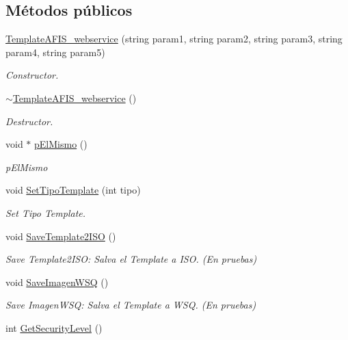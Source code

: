 \subsection*{Métodos públicos}
\begin{DoxyCompactItemize}
\item 
\hyperlink{classTemplateAFIS__webservice_ace8ba45d6e489c7d34bfbfb55970724f}{Template\+A\+F\+I\+S\+\_\+webservice} (string param1, string param2, string param3, string param4, string param5)
\begin{DoxyCompactList}\small\item\em Constructor. \end{DoxyCompactList}\item 
\hyperlink{classTemplateAFIS__webservice_ad58b565c76e20bdd9272401d7319cb25}{$\sim$\+Template\+A\+F\+I\+S\+\_\+webservice} ()
\begin{DoxyCompactList}\small\item\em Destructor. \end{DoxyCompactList}\item 
void $\ast$ \hyperlink{classTemplateAFIS__webservice_a85f73ddfc479ea1f9ba3a6467d1c028b}{p\+El\+Mismo} ()
\begin{DoxyCompactList}\small\item\em p\+El\+Mismo \end{DoxyCompactList}\item 
void \hyperlink{classTemplateAFIS__webservice_a6357de3d3323010cb5890d2f583e0f94}{Set\+Tipo\+Template} (int tipo)
\begin{DoxyCompactList}\small\item\em Set Tipo Template. \end{DoxyCompactList}\item 
void \hyperlink{classTemplateAFIS__webservice_afc08ffa4abcde0b3c0f1c13d973755e1}{Save\+Template2\+I\+SO} ()
\begin{DoxyCompactList}\small\item\em Save Template2\+I\+SO\+: Salva el Template a I\+SO. (En pruebas) \end{DoxyCompactList}\item 
void \hyperlink{classTemplateAFIS__webservice_ae233b5bd61f6754d877e54788332fe92}{Save\+Imagen\+W\+SQ} ()
\begin{DoxyCompactList}\small\item\em Save Imagen\+W\+SQ\+: Salva el Template a W\+SQ. (En pruebas) \end{DoxyCompactList}\item 
int \hyperlink{classTemplateAFIS__webservice_a664f93880a7054b22a2b1faaacda95c3}{Get\+Security\+Level} ()

\end{DoxyCompactItemize}
